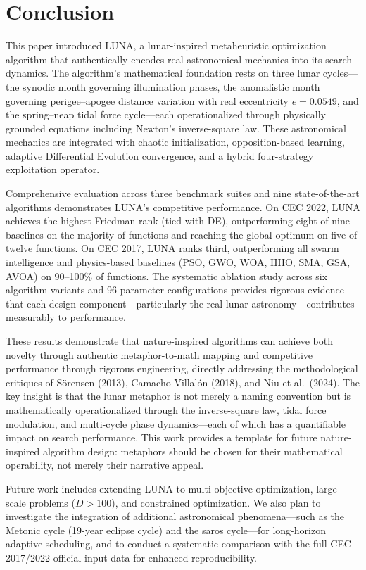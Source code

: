 \documentclass[11pt,a4paper]{article}
\begin{document}
\section{Conclusion}\label{sec:conclusion}

This paper introduced LUNA, a lunar-inspired metaheuristic optimization algorithm that authentically encodes real astronomical mechanics into its search dynamics. The algorithm's mathematical foundation rests on three lunar cycles---the synodic month governing illumination phases, the anomalistic month governing perigee--apogee distance variation with real eccentricity $e=0.0549$, and the spring--neap tidal force cycle---each operationalized through physically grounded equations including Newton's inverse-square law. These astronomical mechanics are integrated with chaotic initialization, opposition-based learning, adaptive Differential Evolution convergence, and a hybrid four-strategy exploitation operator.

Comprehensive evaluation across three benchmark suites and nine state-of-the-art algorithms demonstrates LUNA's competitive performance. On CEC 2022, LUNA achieves the highest Friedman rank (tied with DE), outperforming eight of nine baselines on the majority of functions and reaching the global optimum on five of twelve functions. On CEC 2017, LUNA ranks third, outperforming all swarm intelligence and physics-based baselines (PSO, GWO, WOA, HHO, SMA, GSA, AVOA) on 90--100\% of functions. The systematic ablation study across six algorithm variants and 96 parameter configurations provides rigorous evidence that each design component---particularly the real lunar astronomy---contributes measurably to performance.

These results demonstrate that nature-inspired algorithms can achieve both novelty through authentic metaphor-to-math mapping and competitive performance through rigorous engineering, directly addressing the methodological critiques of S\"orensen (2013), Camacho-Villal\'on (2018), and Niu et al.\ (2024). The key insight is that the lunar metaphor is not merely a naming convention but is mathematically operationalized through the inverse-square law, tidal force modulation, and multi-cycle phase dynamics---each of which has a quantifiable impact on search performance. This work provides a template for future nature-inspired algorithm design: metaphors should be chosen for their mathematical operability, not merely their narrative appeal.

Future work includes extending LUNA to multi-objective optimization, large-scale problems ($D > 100$), and constrained optimization. We also plan to investigate the integration of additional astronomical phenomena---such as the Metonic cycle (19-year eclipse cycle) and the saros cycle---for long-horizon adaptive scheduling, and to conduct a systematic comparison with the full CEC 2017/2022 official input data for enhanced reproducibility.
\end{document}
